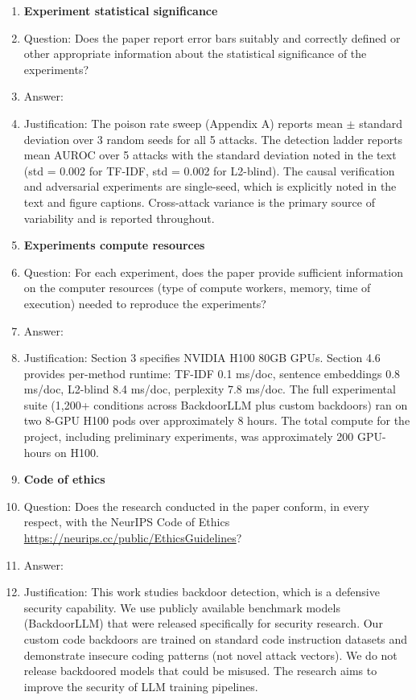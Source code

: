 \begin{enumerate}
\item {\bf Experiment statistical significance}
    \item[] Question: Does the paper report error bars suitably and correctly defined or other appropriate information about the statistical significance of the experiments?
    \item[] Answer: \answerYes{}
    \item[] Justification: The poison rate sweep (Appendix A) reports mean $\pm$ standard deviation over 3 random seeds for all 5 attacks. The detection ladder reports mean AUROC over 5 attacks with the standard deviation noted in the text (std = 0.002 for TF-IDF, std = 0.002 for L2-blind). The causal verification and adversarial experiments are single-seed, which is explicitly noted in the text and figure captions. Cross-attack variance is the primary source of variability and is reported throughout.

\item {\bf Experiments compute resources}
    \item[] Question: For each experiment, does the paper provide sufficient information on the computer resources (type of compute workers, memory, time of execution) needed to reproduce the experiments?
    \item[] Answer: \answerYes{}
    \item[] Justification: Section 3 specifies NVIDIA H100 80GB GPUs. Section 4.6 provides per-method runtime: TF-IDF 0.1 ms/doc, sentence embeddings 0.8 ms/doc, L2-blind 8.4 ms/doc, perplexity 7.8 ms/doc. The full experimental suite (1,200+ conditions across BackdoorLLM plus custom backdoors) ran on two 8-GPU H100 pods over approximately 8 hours. The total compute for the project, including preliminary experiments, was approximately 200 GPU-hours on H100.

\item {\bf Code of ethics}
    \item[] Question: Does the research conducted in the paper conform, in every respect, with the NeurIPS Code of Ethics \url{https://neurips.cc/public/EthicsGuidelines}?
    \item[] Answer: \answerYes{}
    \item[] Justification: This work studies backdoor detection, which is a defensive security capability. We use publicly available benchmark models (BackdoorLLM) that were released specifically for security research. Our custom code backdoors are trained on standard code instruction datasets and demonstrate insecure coding patterns (not novel attack vectors). We do not release backdoored models that could be misused. The research aims to improve the security of LLM training pipelines.


\end{enumerate}
